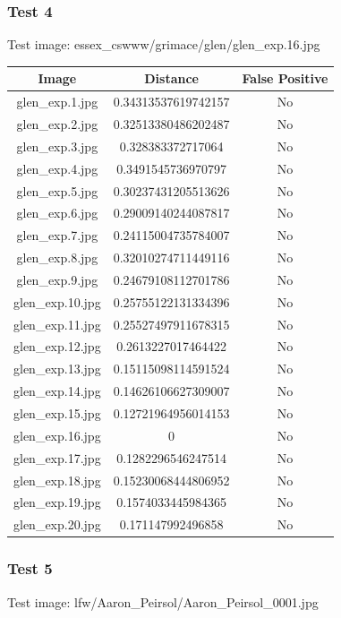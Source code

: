 \documentclass[12pt]{article}
\begin{document}
\subsubsection{Test 4}
Test image: essex\_cswww/grimace/glen/glen\_exp.16.jpg

\begin{center}
\begin{tabular}{ccc}
Image & Distance & False Positive \\
\hline
glen\_exp.1.jpg & 0.34313537619742157 & No \\
glen\_exp.2.jpg & 0.32513380486202487 & No \\
glen\_exp.3.jpg & 0.328383372717064 & No \\
glen\_exp.4.jpg & 0.3491545736970797 & No \\
glen\_exp.5.jpg & 0.30237431205513626 & No \\
glen\_exp.6.jpg & 0.29009140244087817 & No \\
glen\_exp.7.jpg & 0.24115004735784007 & No \\
glen\_exp.8.jpg & 0.32010274711449116 & No \\
glen\_exp.9.jpg & 0.24679108112701786 & No \\
glen\_exp.10.jpg & 0.25755122131334396 & No \\
glen\_exp.11.jpg & 0.25527497911678315 & No \\
glen\_exp.12.jpg & 0.2613227017464422 & No \\
glen\_exp.13.jpg & 0.15115098114591524 & No \\
glen\_exp.14.jpg & 0.14626106627309007 & No \\
glen\_exp.15.jpg & 0.12721964956014153 & No \\
glen\_exp.16.jpg & 0 & No \\
glen\_exp.17.jpg & 0.1282296546247514 & No \\
glen\_exp.18.jpg & 0.15230068444806952 & No \\
glen\_exp.19.jpg & 0.1574033445984365 & No \\
glen\_exp.20.jpg & 0.171147992496858 & No \\
\end{tabular}
\end{center}

\subsubsection{Test 5}
Test image: lfw/Aaron\_Peirsol/Aaron\_Peirsol\_0001.jpg
\end{document}
